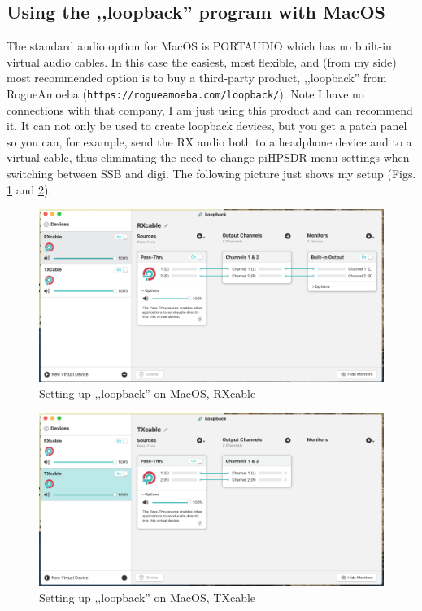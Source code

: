 \documentclass[12pt]{book}
\def\pH{pi\-HPSDR\xspace}
\begin{document}
\subsection[MacOS: LoopBack]{Using the ,,loopback'' program with MacOS}
The standard audio option for MacOS is PORTAUDIO which has no built-in virtual
audio cables. In this case
the easiest, most flexible, and (from my side) most recommended option is
to buy a third-party product,  ,,loopback'' from RogueAmoeba
(\texttt{https://rogueamoeba.com/loopback/}).
Note I have no connections with that company, I am just using this product and
can recommend it. It can not only be used to create loopback devices, but you get
a patch panel so you can, for example, send the RX audio both to a headphone device
and to a virtual cable, thus eliminating the need to change \pH menu settings
when switching between SSB and digi. The following picture just shows my setup
(Figs. \ref{fig:loopback_rx} and \ref{fig:loopback_tx}).

\begin{figure}[ht!]
\center
\includegraphics[width=12cm]{loopback_rx.png}
\caption{Setting up ,,loopback'' on MacOS, RXcable}
\label{fig:loopback_rx}
\end{figure}

\begin{figure}[ht!]
\center
\includegraphics[width=12cm]{loopback_tx.png}
\caption{Setting up ,,loopback'' on MacOS, TXcable}
\label{fig:loopback_tx}
\end{figure}
\end{document}

